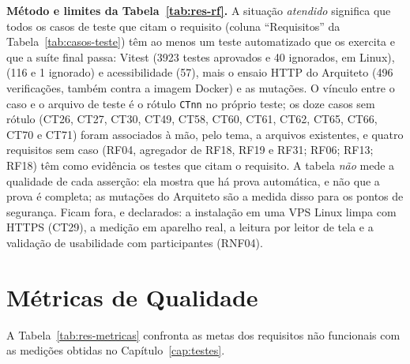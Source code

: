 
\textbf{Método e limites da Tabela~\ref{tab:res-rf}.} A situação \emph{atendido} significa que todos os casos de teste que citam o requisito (coluna ``Requisitos'' da Tabela~\ref{tab:casos-teste}) têm ao menos um teste automatizado que os exercita e que a suíte final passa: Vitest (3923 testes aprovados e 40 ignorados, em Linux),  (116 e 1 ignorado) e acessibilidade (57), mais o ensaio HTTP do Arquiteto (496 verificações, também contra a imagem Docker) e as mutações. O vínculo entre o caso e o arquivo de teste é o rótulo \texttt{CTnn} no próprio teste; os doze casos sem rótulo (CT26, CT27, CT30, CT49, CT58, CT60, CT61, CT62, CT65, CT66, CT70 e CT71) foram associados à mão, pelo tema, a arquivos existentes, e quatro requisitos sem caso (RF04, agregador de RF18, RF19 e RF31; RF06; RF13; RF18) têm como evidência os testes que citam o requisito. A tabela \emph{não} mede a qualidade de cada asserção: ela mostra que há prova automática, e não que a prova é completa; as mutações do Arquiteto são a medida disso para os pontos de segurança. Ficam fora, e declarados: a instalação em uma VPS Linux limpa com HTTPS (CT29), a medição em aparelho real, a leitura por leitor de tela e a validação de usabilidade com participantes (RNF04).

\section{Métricas de Qualidade}\label{sec:res-metricas}

A Tabela~\ref{tab:res-metricas} confronta as metas dos requisitos não funcionais com as medições obtidas no Capítulo~\ref{cap:testes}.

